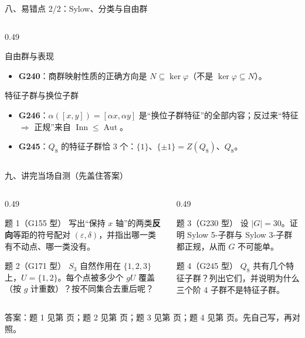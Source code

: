 \documentclass[aspectratio=169,10pt,fontset=none]{ctexbeamer}
\newcommand{\ex}[1]{\textcolor{accent}{\footnotesize\bfseries #1}}
\begin{document}
\begin{frame}[t]{八、易错点 2/2：Sylow、分类与自由群}
\begin{columns}[T,onlytextwidth]
\begin{column}{0.49\textwidth}
\begin{alertblock}{\footnotesize 自由群与表现}
\begin{itemize}
          \item \ex{G240}：商群映射性质的正确方向是 $N\subseteq\ker\varphi$（不是 $\ker\varphi\subseteq N$）。
        \end{itemize}
      \end{alertblock}
      \begin{alertblock}{\footnotesize 特征子群与换位子群}
        \scriptsize
        \begin{itemize}\setlength{\itemsep}{1pt}
          \item \ex{G246}：$\alpha([x,y])=[\alpha x,\alpha y]$ 是“换位子群特征”的全部内容；反过来“特征 $\Rightarrow$ 正规”来自 $\operatorname{Inn}\le\operatorname{Aut}$。
          \item \ex{G245}：$Q_8$ 的特征子群恰 3 个：$\{1\}$、$\{\pm1\}=Z(Q_8)$、$Q_8$。
        \end{itemize}
      \end{alertblock}
    \end{column}
  \end{columns}
\end{frame}

\begin{frame}[t]{九、讲完当场自测（先盖住答案）}
  \label{sec:selftest}
  \begin{columns}[T,onlytextwidth]
    \begin{column}{0.49\textwidth}
      \begin{exampleblock}{\footnotesize 题 1（G155 型）}
        \scriptsize
        写出“保持 $x$ 轴”的两类\textbf{反向}等距的符号配对 $(\varepsilon,\delta)$，并指出哪一类有不动点、哪一类没有。
      \end{exampleblock}
      \begin{exampleblock}{\footnotesize 题 2（G171 型）}
        \scriptsize
        $S_3$ 自然作用在 $\{1,2,3\}$ 上，$U=\{1,2\}$。每个点被多少个 $gU$ 覆盖（按 $g$ 计重数）？按不同集合去重后呢？
      \end{exampleblock}
    \end{column}
    \begin{column}{0.49\textwidth}
      \begin{exampleblock}{\footnotesize 题 3（G230 型）}
        \scriptsize
        设 $|G|=30$。证明 Sylow 5-子群与 Sylow 3-子群都正规，从而 $G$ 不可能单。
      \end{exampleblock}
      \begin{exampleblock}{\footnotesize 题 4（G245 型）}
        \scriptsize
        $Q_8$ 共有几个特征子群？列出它们，并说明为什么三个阶 4 子群不是特征子群。
      \end{exampleblock}
    \end{column}
  \end{columns}
  \vspace{0.3em}
  {\scriptsize\color{ink!70} 答案：题 1 见第 \pageref{ex:G155} 页；题 2 见第 \pageref{ex:G171} 页；题 3 见第 \pageref{ex:G230} 页；题 4 见第 \pageref{ex:G245} 页。先自己写，再对照。}
\end{frame}
\end{document}
